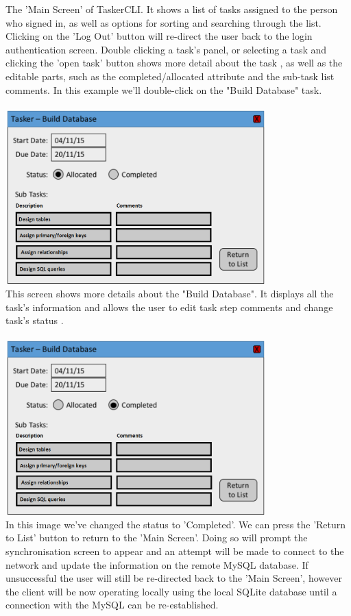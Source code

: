 \documentclass{project}
\begin{document}
The 'Main Screen' of TaskerCLI. It shows a list of tasks assigned to the person who signed in, as well as options for sorting and searching through the list. Clicking on the 'Log Out' button will re-direct the user back to the login authentication screen. Double clicking a task's panel, or selecting a task and clicking the 'open task' button shows more detail about the task \cite{se.qa.rs fr10}, as well as the editable parts, such as the completed/allocated attribute and the sub-task list comments. In this example we'll double-click on the "Build Database" task. \\~\\
\newline
\includegraphics[width=0.75\textwidth, center]{images/5.2/TaskerCLITaskInfo} \\
This screen shows more details about the "Build Database". It displays all the task's information and allows the user to edit task step comments and change task's status \cite{se.qa.rs fr10}. \\~\\
\newline
\includegraphics[width=0.75\textwidth, center]{images/5.2/TaskerCLITaskUpdated} \\
In this image we've changed the status to 'Completed'. We can press the 'Return to List' button to return to the 'Main Screen'. Doing so will prompt the synchronisation screen to appear and an attempt will be made to connect to the network and update the information on the remote MySQL database. If unsuccessful the user will still be re-directed back to the 'Main Screen', however the client will be now operating locally using the local SQLite database until a connection with the MySQL can be re-established.\\~\\
\end{document}
